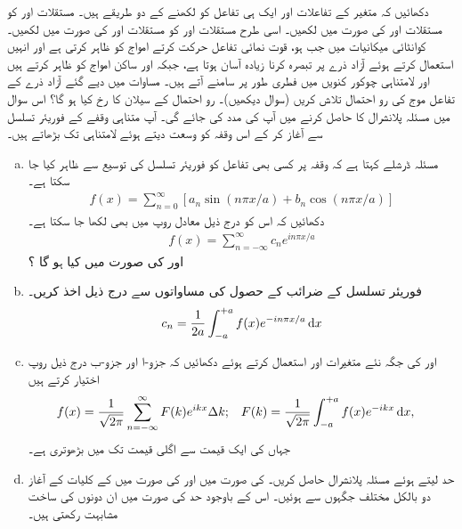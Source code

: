 دکھائیں کہ متغیر    کے تفاعلات   اور   ایک ہی تفاعل کو   لکھنے کے  دو  طریقے  ہیں۔ مستقلات  اور  کو مستقلات  اور  کی صورت میں لکھیں۔ اسی طرح مستقلات  اور  کو مستقلات  اور  کی صورت میں لکھیں۔  کوانٹائی میکانیات میں جب  ہو، قوت نمائی تفاعل حرکت کرتے امواج کو ظاہر کرتی ہے اور انہیں استعمال کرتے ہوئے آزاد ذرے پر تبصرہ کرنا زیادہ آسان ہوتا ہے، جبکہ  اور  ساکن امواج کو ظاہر کرتے ہیں اور لامتناہی چوکور کنویں میں فطری طور پر سامنے آتے ہیں۔ 
مساوات  میں دیے  گئے آزاد ذرے کے تفاعل موج کی رو احتمال    تلاش کریں (سوال    دیکھیں)۔  رو  احتمال کے  سیلان  کا رخ کیا ہو گا؟
اس سوال میں  مسئلہ پلانشرال کا  حاصل کرنے میں  آپ کی مدد  کی جائے گی۔ آپ متناہی وقفے  کے فوریئر تسلسل سے آغاز کر کے اس وقفہ کو وسعت دیتے ہوئے لامتناہی  تک بڑھاتے ہیں۔ 
\begin{enumerate}[a. ]
\item 
مسئلہ ڈرشلے کہتا ہے کہ وقفہ  پر کسی بھی تفاعل  کو فوریئر تسلسل  کی توسیع سے ظاہر کیا جا سکتا ہے۔
\begin{align*}
f(x) = \sum_{n=0}^{\infty} [ a_{n}\sin( n\pi x/a ) + b_{n}\cos( n\pi x/a )]
\end{align*}
دکھائیں کہ اس کو درج ذیل معادل روپ میں بھی لکھا جا سکتا ہے۔
\begin{align*}
f(x) = \sum_{n=-\infty}^{\infty} c_{n}e^{i n \pi x /a}
\end{align*}
 اور  کی صورت میں  کیا ہو گا ؟
 \item
 فوریئر تسلسل کے ضرائب کے حصول کی مساواتوں سے درج ذیل اخذ کریں۔
\begin{align*}
c_{n} = \frac{1}{2a} \int_{-a}^{+a} f(x)e^{-in\pi x/a} \dif x
\end{align*}
\item
{} اور  کی جگہ نئے متغیرات  اور 
   استعمال کرتے ہوئے دکھائیں کہ جزو-ا اور جزو-ب درج ذیل روپ اختیار کرتے ہیں 
\begin{align*}
f(x) &= \frac{1}{\sqrt{2 \pi}} \sum_{n=-\infty}^{\infty} F(k)e^{ikx} \Delta k; && F(k) = \frac{1}{\sqrt{2\pi}} \int_{-a}^{+a} f(x) e^{-ikx} \dif x,
\end{align*}
جہاں   کی ایک قیمت سے اگلی  قیمت تک  میں  بڑھوتری   ہے۔ 
\item
حد   لیتے ہوئے مسئلہ پلانشرال حاصل کریں۔   کی صورت میں  اور  کی صورت میں  کے کلیات کے آغاز دو بالکل مختلف جگہوں سے  ہوئیں۔ اس کے باوجود حد  کی صورت میں ان دونوں کی ساخت مشابہت رکھتی ہیں۔ 
\end{enumerate}
